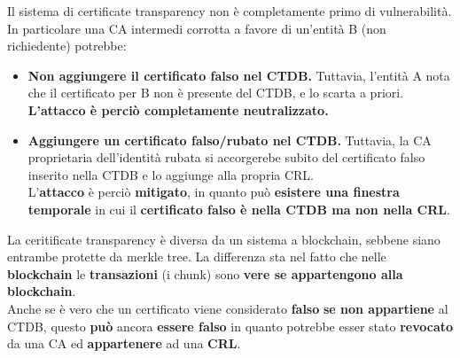 Il sistema di certificate transparency non è completamente primo di vulnerabilità. In particolare una CA intermedi corrotta a favore di un'entità B (non richiedente) potrebbe:
\begin{itemize}
    \item \textbf{Non aggiungere il certificato falso nel CTDB.} Tuttavia, l’entità A nota che il certificato per B non è presente del CTDB, e lo scarta a priori. \textbf{ L’attacco è perciò completamente neutralizzato.}
\item \textbf{Aggiungere un certificato falso/rubato nel CTDB.} Tuttavia, la CA proprietaria dell’identità rubata si accorgerebe subito del certificato falso inserito nella CTDB e lo aggiunge alla propria CRL.\\
L’\textbf{attacco} è perciò \textbf{mitigato}, in quanto può \textbf{esistere una finestra temporale} in cui il \textbf{certificato falso è nella CTDB ma non nella CRL}.
\end{itemize}
\begin{remark}
La ceritificate transparency è diversa da un sistema a blockchain, sebbene siano entrambe protette da merkle tree. La differenza sta nel fatto che nelle \textbf{blockchain} le \textbf{transazioni} (i chunk) sono \textbf{vere se appartengono alla blockchain}.\\
Anche se è vero che un certificato viene considerato \textbf{falso} \textbf{se non appartiene} al CTDB, questo \textbf{può} ancora \textbf{essere falso} in quanto potrebbe esser stato \textbf{revocato} da una CA ed \textbf{appartenere} ad una \textbf{CRL}.
\end{remark}

